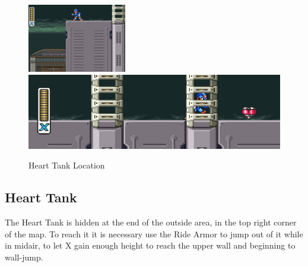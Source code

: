 \begin{figure}[htp]
	\centering
	\includegraphics[height=3cm]{figures/X3/Blast_hornet/Heart_1.jpg}\\\vspace{2pt}
	\includegraphics[width=.7\linewidth]{figures/X3/Blast_hornet/Heart_2.jpg}
	\caption{Heart Tank Location}
\end{figure}
\subsection{Heart Tank}

The Heart Tank is hidden at the end of the outside area, in the top right corner of the map. To reach it it is necessary use the Ride Armor to jump out of it while in midair, to let X gain enough height to reach the upper wall and beginning to wall-jump.

